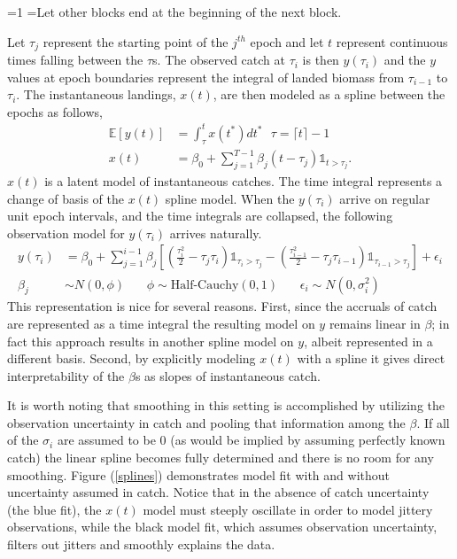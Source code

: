 \documentclass[12pt]{article}
\newcounter{alphasect}
\def\alphainsection{0}
\newenvironment{alphasection}{%
  \ifnum\alphainsection=1%
    \errhelp={Let other blocks end at the beginning of the next block.}
    \errmessage{Nested Alpha section not allowed}
  \fi%
  \setcounter{alphasect}{0}
  \def\alphainsection{1}
}{%
  \setcounter{alphasect}{0}
  \def\alphainsection{0}
}%
\begin{document}
\begin{alphasection}
%
Let $\tau_j$ represent the starting point of the $j^{th}$ epoch and let $t$ 
represent continuous times falling between the $\tau$s. The observed catch 
at $\tau_i$ is then $y(\tau_i)$ and the $y$ values at epoch boundaries represent 
the integral of landed biomass from $\tau_{i-1}$ to $\tau_i$. The instantaneous 
landings, $x(t)$, are then modeled as a spline between the epochs as follows, %
%
\begin{align}
\mathds{E}[y(t)] &= \int_\tau^{t} x(t^*) dt^* ~~~ \tau=\lceil t \rceil-1 \\
x(t) &= \beta_0 + \sum_{j=1}^{T-1} \beta_j (t-\tau_j) \mathds{1}_{t>\tau_j}.
\end{align}
%
$x(t)$ is a latent model of instantaneous catches. The time integral represents 
a change of basis of the $x(t)$ spline model. When the $y(\tau_i)$ arrive
on regular unit epoch intervals, and the time integrals are collapsed, the 
following observation model for $y(\tau_i)$ arrives naturally. 
\begin{align} %
y(\tau_i) &= \beta_0 + \sum_{j=1}^{i-1} \beta_j \left[ \left(\frac{\tau_i^2}{2}-\tau_j\tau_i\right)\mathds{1}_{\tau_i>\tau_j} - \left(\frac{\tau_{i-1}^2}{2}-\tau_j\tau_{i-1}\right)\mathds{1}_{\tau_{i-1}>\tau_j}\right] + \epsilon_i \\
\beta_j &\sim N(0, \phi) ~~~~ ~~~~ \phi \sim \text{Half-Cauchy}(0, 1) ~~~~ ~~~~ \epsilon_i \sim N(0, \sigma^2_i) \nonumber
\end{align}
%
This representation is nice for several reasons. First, since the accruals 
of catch are represented as a time integral the resulting model on $y$ remains 
linear in $\beta$; in fact this approach results in another spline model on $y$, 
albeit represented in a different basis. Second, by explicitly modeling $x(t)$ 
with a spline it gives direct interpretability of the $\beta$s as slopes of 
instantaneous catch.  


%
It is worth noting that smoothing in this setting is accomplished by utilizing
the observation uncertainty in catch and pooling that information among the $\beta$.
If all of the $\sigma_i$ are assumed to be $0$ (as would be implied by assuming 
perfectly known catch) the linear spline becomes fully determined and there is 
no room for any smoothing. Figure (\ref{splines}) demonstrates model fit with 
and without uncertainty assumed in catch. Notice that in the absence of catch 
uncertainty (the blue fit), the $x(t)$ model must steeply oscillate 
in order to model jittery observations, while the black model fit, which assumes 
observation uncertainty, filters out jitters and smoothly explains the data. 


\end{alphasection}
\end{document}
